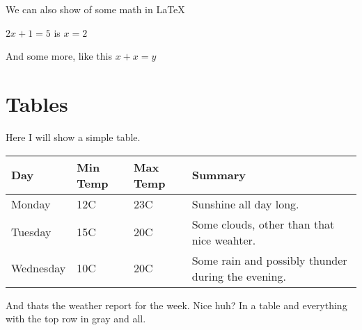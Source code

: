 \documentclass[11pt,a4paper]{article}
\begin{document}
We can also show of some math in \LaTeX\

\(2x+1=5\) is \(x=2\)

And some more, like this \(x+x=y\)


\pagebreak

\section{Tables}
Here I will show a simple table.

\begin{table}[h]
\begin{center}
    \begin{tabular}{ | l | l | l | p{7cm} |}
    \hline
    \cellcolor[gray]{0.9}\textbf{Day} & 
    \cellcolor[gray]{0.9}\textbf{Min Temp} & 
    \cellcolor[gray]{0.9}\textbf{Max Temp} & 
    \cellcolor[gray]{0.9}\textbf{Summary} \\ \hline
    Monday & 12C & 23C & Sunshine all day long.  \\ \hline
    Tuesday & 15C & 20C & Some clouds, other than that nice weahter. \\ \hline
    Wednesday & 10C & 20C & Some rain and possibly thunder during the evening. 
        \\ \hline
    \end{tabular}
\end{center}
\end{table}
And thats the weather report for the week. Nice huh? In a table and everything 
with the top row in gray and all.
\end{document}
